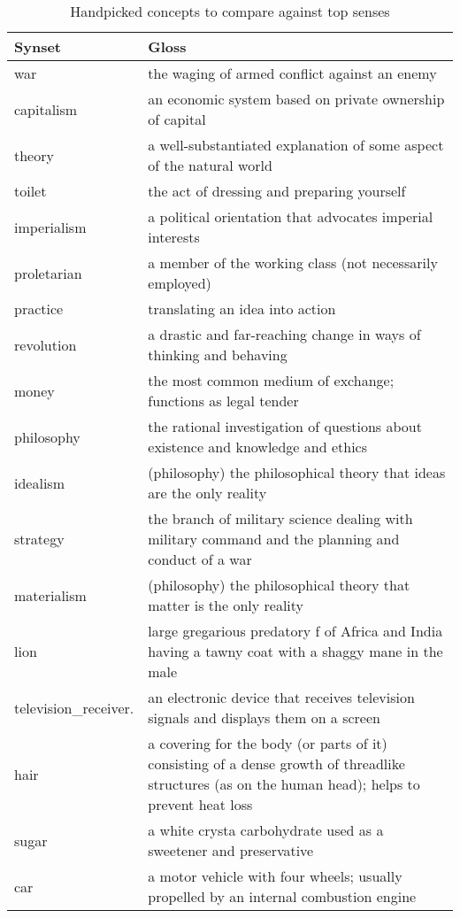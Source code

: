 
\begin{table*}[ht]
\caption*{Handpicked concepts to compare against top senses}
\centering
\begin{tabular}{ p{2.5cm} p{15cm} }
    \toprule
    Synset & Gloss \\
    \midrule
            war & the waging of armed conflict against an enemy \\
            capitalism & an economic system based on private ownership of capital\\
            theory & a well-substantiated explanation of some aspect of the natural world \\
            toilet & the act of dressing and preparing yourself \\
            imperialism & a political orientation that advocates imperial interests \\
            proletarian & a member of the working class (not necessarily employed) \\
            practice & translating an idea into action \\
            revolution & a drastic and far-reaching change in ways of thinking and behaving \\
            money & the most common medium of exchange; functions as legal tender \\
            philosophy & the rational investigation of questions about existence and knowledge and ethics \\
            idealism & (philosophy) the philosophical theory that ideas are the only reality \\
            strategy & the branch of military science dealing with military command and the planning and conduct of a war \\
            materialism & (philosophy) the philosophical theory that matter is the only reality \\
            lion & large gregarious predatory f of Africa and India having a tawny coat with a shaggy mane in the male \\
            television\_receiver. & an electronic device that receives television signals and displays them on a screen \\
            hair & a covering for the body (or parts of it) consisting of a dense growth of threadlike structures (as on the human head); helps to prevent heat loss \\
            sugar & a white crysta carbohydrate used as a sweetener and preservative \\
            car & a motor vehicle with four wheels; usually propelled by an internal combustion engine \\

    \bottomrule
\end{tabular}

\end{table*}
